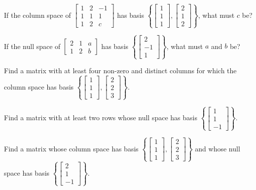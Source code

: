 \item If the column space of $\left[ \begin{array}{ccr} 1&2&-1\\1&1&1\\1&2&c\end{array} \right]$ has basis $\left\{ \left[ \begin{array}{c} 1\\1\\1 \end{array} \right], \left[ \begin{array}{c} 2\\1\\2 \end{array} \right]\right\}$, what must $c$ be?

\item If the null space of $\left[ \begin{array}{ccc} 2&1&a\\ 1&2&b \end{array} \right]$ has basis $\left\{ \left[ \begin{array}{r} 2\\-1\\1 \end{array} \right]\right\}$, what must $a$ and $b$ be?

\item Find a matrix with at least four non-zero and distinct columns for which the column space has basis $\left\{ \left[ \begin{array}{c} 1\\1\\1\end{array} \right] , \left[ \begin{array}{c} 2\\2\\3\end{array} \right] \right\}$.

\item Find a matrix with at least two rows whose null space has basis $\left\{ \left[ \begin{array}{r} 1\\1\\-1\end{array} \right] \right\}$.

\item Find a matrix whose column space has basis $\left\{ \left[ \begin{array}{c} 1\\1\\1\end{array} \right] , \left[ \begin{array}{c} 2\\2\\3\end{array} \right] \right\}$ and whose null space has basis $\left\{ \left[ \begin{array}{r} 2\\1\\-1\end{array} \right] \right\}$.

